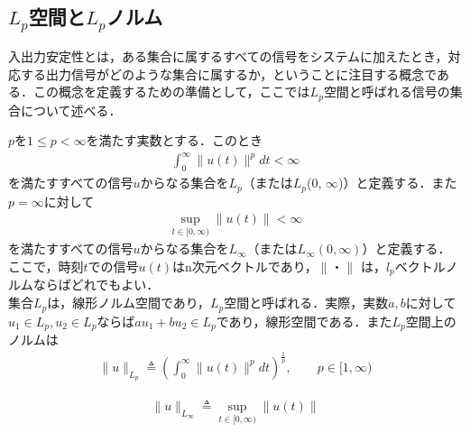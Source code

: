 \documentclass[a4paper,11pt,uplatex]{jsarticle} %
\theoremstyle{definition}	%
\begin{document}
\subsection{$L_p$空間と$L_p$ノルム}
入出力安定性とは，ある集合に属するすべての信号をシステムに加えたとき，対応する出力信号がどのような集合に属するか，ということに注目する概念である．この概念を定義するための準備として，ここでは$L_p$空間と呼ばれる信号の集合について述べる．

$p$を$ 1 \leq p < \infty$を満たす実数とする．このとき
\begin{align}
\label{definition of L_p}
\int_{0}^\infty \| u(t) \|^p dt < \infty
\end{align}
を満たすすべての信号$u$からなる集合を$L_p$（または$L_p$(0, $\infty$)）と定義する．また$ p = \infty $に対して
\begin{align}
\label{definition of L_infty}
\sup_{t \in [0, \infty)} \| u(t) \| < \infty
\end{align}
を満たすすべての信号$u$からなる集合を$L_\infty$（または$L_\infty(0,\infty)$）と定義する．ここで，時刻$t$での信号$u(t)$はn次元ベクトルであり，$\| ・ \|$
は，$l_p$ベクトルノルムならばどれでもよい．\\
集合$L_p$は，線形ノルム空間であり，$L_p$空間と呼ばれる．実際，実数$a,b$に対して$ u_1 \in L_p , u_2 \in L_p $ならば$au_1 + bu_2 \in L_p $であり，線形空間である．また$L_p$空間上のノルムは
\begin{align}
\label{norm of L_p}
\| u \|_{L_p} \triangleq ( \int^\infty_0 \| u(t) \|^p dt )^{\frac{1}{p}},\qquad  p \in [1, \infty) 
\end{align}

\begin{align}
\label{norm of L_infty}
\| u \|_{L_\infty} \triangleq \sup_{t \in [0, \infty)} \| u(t) \|
\end{align}
\end{document}
